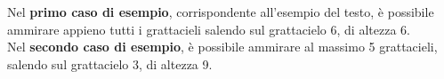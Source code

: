 \Examples
\begin{example}
%
\end{example}
\begin{example}
%
\end{example}


\Explanation
Nel \textbf{primo caso di esempio}, corrispondente all'esempio del testo, è possibile ammirare appieno tutti i grattacieli salendo sul grattacielo 6, di altezza 6.\\[2mm]
Nel \textbf{secondo caso di esempio}, è possibile ammirare al massimo 5 grattacieli, salendo sul grattacielo 3, di altezza 9.